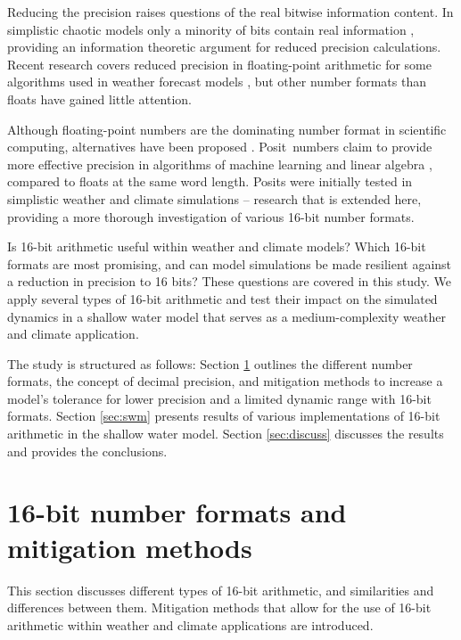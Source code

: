 \documentclass[draft]{agujournal2019}
\begin{document}
Reducing the precision raises questions of the real bitwise information content.
In simplistic chaotic models only a minority of bits contain real information
\cite{Jeffress2017}, providing an information theoretic argument for reduced
precision calculations. Recent research covers reduced precision in
floating-point arithmetic for some algorithms used in weather forecast models
\cite{Duben2014,Thornes2017,Hatfield2018,Hatfield2020}, but other number formats
than floats have gained little attention.

Although floating-point numbers are the dominating number format in scientific
computing, alternatives have been proposed \cite{Gustafson2017a,Johnson2020}.
Posit\texttrademark ~numbers claim to provide more effective precision in algorithms
of machine learning and linear algebra \cite{Gustafson2017,Langroudi2019}, compared
to floats at the same word length. Posits were initially tested in simplistic
weather and climate simulations \cite{Klower2019c} -- research that is extended
here, providing a more thorough investigation of various 16-bit number formats.

Is 16-bit arithmetic useful within weather and climate models? Which 16-bit
formats are most promising, and can model simulations be made resilient
against a reduction in precision to 16 bits? These questions are covered in
this study. We apply several types of 16-bit arithmetic and test their impact
on the simulated dynamics in a shallow water model that serves as a medium-complexity
weather and climate application.

The study is structured as follows: Section \ref{sec:formats} outlines the
different number formats, the concept of decimal precision, and mitigation
methods to increase a model's tolerance for lower precision and a limited dynamic
range with 16-bit formats. Section \ref{sec:swm} presents results
of various implementations of 16-bit arithmetic in the shallow water model.
Section \ref{sec:discuss} discusses the results and provides the conclusions.

\section{16-bit number formats and mitigation methods}
\label{sec:formats}

This section discusses different types of 16-bit arithmetic, and similarities
and differences between them. Mitigation methods that allow for the use of
16-bit arithmetic within weather and climate applications are introduced.
\end{document}

